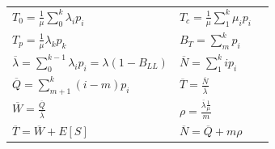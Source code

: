 \vfill\null
\columnbreak
\begin{minipage}{.22\textwidth}
	\begin{tabular}{lp{3cm} l}
		$T_0=\frac{1}{\mu}\sum\limits_0^k{\lambda_{i}p_{i}}$                           & $T_c=\frac{1}{\mu}\sum\limits_1^k{\mu_{i}p_{i}} $      \\
		$T_p=\frac{1}{\mu}{\lambda_{k}p_{k}}$                                          & $B_T=\sum_{m}^{k}p_{i} $                               \\
		$\overline{\lambda}=\sum\limits_{0}^{k-1}{\lambda_{i}p_{i}}=\lambda(1-B_{LL})$ & $\overline{N}=\sum\limits_{1}^{k}{{i}p_{i}}$           \\
		$\overline{Q}=\sum\limits_{m+1}^{k}{(i-m)p_i}$                                 & $\overline{T}=\frac{\overline{N}}{\overline{\lambda}}$ \\
		$\overline{W}=\frac{\overline{Q}}{\overline{\lambda}}$                         & $\rho=\frac{\overline{\lambda}{\frac{1}{\mu}}}{m}$     \\
		$\overline{T}=\overline{W}+E[S]$                                               & $\overline{N}=\overline{Q}+m\rho$                      \\
	\end{tabular}
\end{minipage}
